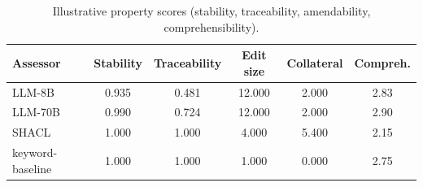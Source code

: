 \begin{table}[htbp]
\centering
\caption{Illustrative property scores (stability, traceability, amendability, comprehensibility).}
\label{tab:property_scores}
\begin{tabular}{lccccc}
\toprule
Assessor & Stability & Traceability & Edit size & Collateral & Compreh. \\
\midrule
LLM-8B & 0.935 & 0.481 & 12.000 & 2.000 & 2.83 \\
LLM-70B & 0.990 & 0.724 & 12.000 & 2.000 & 2.90 \\
SHACL & 1.000 & 1.000 & 4.000 & 5.400 & 2.15 \\
keyword-baseline & 1.000 & 1.000 & 1.000 & 0.000 & 2.75 \\
\bottomrule
\end{tabular}
\end{table}
